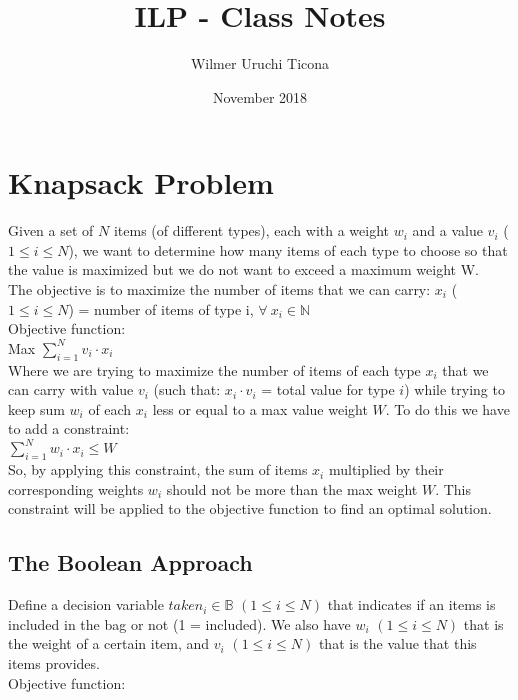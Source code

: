 \documentclass[11pt, oneside]{article}   	%
\title{ILP - Class Notes}
\author{Wilmer Uruchi Ticona}
\date{November 2018}							%
\begin{document}
\maketitle
\section{Knapsack Problem}
Given a set of $N$ items (of different types), each with a weight $w_i$ and a value $v_i$ ($1 \leq i \leq N$), we want to determine how many items of each type to choose so that the value is maximized but we do not want to exceed a maximum weight W.\\

The objective is to maximize the number of items that we can carry: $x_i$ ($1 \leq i \leq N$) = number of items of type i, $\forall\ x_i \in \mathbb{N}$\\

Objective function:\\

Max $\sum_{i = 1}^{N} v_i \cdot x_i$ \\

Where we are trying to maximize the number of items of each type $x_i$ that we can carry with value $v_i$ (such that: $x_i \cdot v_i$ = total value for type $i$) while trying to keep sum $w_i$ of each $x_i$ less or equal to a max value weight $W$. To do this we have to add a constraint:\\

$\sum_{i = 1}^{N} w_i \cdot x_i \leq W$\\

So, by applying this constraint, the sum of items $x_i$ multiplied by their corresponding weights $w_i$ should not be more than the max weight $W$. This constraint will be applied to the objective function to find an optimal solution.\\

\subsection{The Boolean Approach}

Define a decision variable $taken_i \in  \mathbb{B}$ $(1 \leq i \leq N)$ that indicates if an items is included in the bag or not (1 = included). We also have $w_i$ $(1 \leq i \leq N)$ that is the weight of a certain item, and $v_i$ $(1 \leq i \leq N)$ that is the value that this items provides.\\

Objective function:\\
\end{document}
